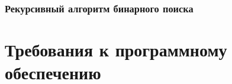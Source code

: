 \documentclass{bmstu}
\begin{document}
\subsubsection{Рекурсивный алгоритм бинарного поиска}


\section{Требования к программному обеспечению}
\end{document}
